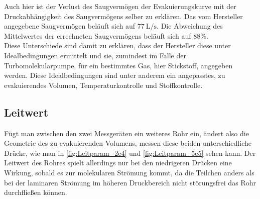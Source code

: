 Auch hier ist der Verlust des Saugvermögen der Evakuierungskurve mit der Druckabhängigkeit des Saugvermögens selber zu erklären.
Das vom Hersteller angegebene Saugvermögen beläuft sich auf $\SI{77}{\liter\per\second}$.
Die Abweichung des Mittelwertes der errechneten Saugvermögens beläuft sich auf $\num{88}\%$. \\

Diese Unterschiede sind damit zu erklären, dass der Hersteller diese unter Idealbedingungen ermittelt und sie, zumindest im Falle der Turbomolekularpumpe,
für ein bestimmtes Gas, hier Stickstoff, angegeben werden. Diese Idealbedingungen sind unter anderem ein angepasstes, zu evakuierendes Volumen, Temperaturkontrolle und Stoffkontrolle.

\subsection{Leitwert}

Fügt man zwischen den zwei Messgeräten ein weiteres Rohr ein, ändert also die Geometrie des zu evakuierenden Volumens,
messen diese beiden unterschiedliche Drücke, wie man in \ref{fig:Leitparam_2e4} und \ref{fig:Leitparam_5e5} sehen kann.
Der Leitwert des Rohres spielt allerdings nur bei den niedrigeren Drücken eine Wirkung, sobald es zur molekularen Strömung kommt,
da die Teilchen anders als bei der laminaren Strömung im höheren Druckbereich nicht störungsfrei das Rohr durchfließen können. \\
